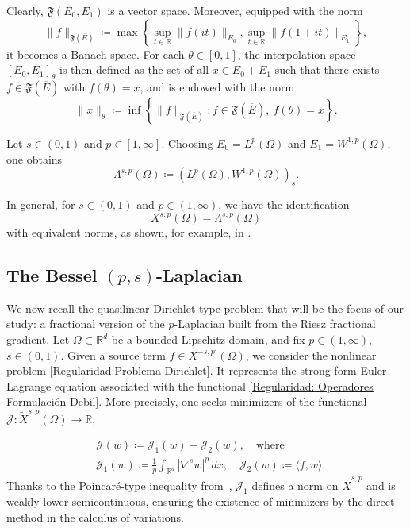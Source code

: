 \documentclass[]{amsart}
\theoremstyle{definition}
\theoremstyle{definition}
\theoremstyle{remark}
\numberwithin{equation}{section}
\begin{document}
Clearly, \( \mathfrak{F}(E_0, E_1) \) is a vector space. Moreover, equipped with the norm
\[
\|f\|_{\mathfrak{F}(\overline{E})} \coloneq \max \left\{ \sup_{t \in \mathbb{R}} \|f(i t)\|_{E_0}, \sup_{t \in \mathbb{R}} \|f(1 + i t)\|_{E_1} \right\},
\]
it becomes a Banach space. For each \( \theta \in [0, 1] \), the interpolation space \( [E_0, E_1]_\theta \) is then defined as the set of all \( x \in E_0 + E_1 \) such that there exists \( f \in \mathfrak{F}(\overline{E}) \) with \( f(\theta) = x \), and is endowed with the norm
\[
\|x\|_\theta \coloneq \inf \left\{ \|f\|_{\mathfrak{F}(\overline{E})} : f \in \mathfrak{F}(\overline{E}), \ f(\theta) = x \right\}.
\]

Let \( s \in (0,1) \) and \( p \in [1, \infty] \). Choosing \( E_0 = L^p(\Omega) \) and \( E_1 = W^{1,p}(\Omega) \), one obtains
\[
\Lambda^{s,p}(\Omega) \coloneq \left(L^{p}(\Omega), W^{1,p}(\Omega)\right)_{s}.
\]

In general, for \( s \in (0,1) \) and \( p \in (1, \infty) \), we have the identification
\[
X^{s,p}(\Omega) = \Lambda^{s,p}(\Omega)
\]
with equivalent norms, as shown, for example, in \cite[Proposition 2.4.3]{campos2021lions}.

\subsection{The Bessel $(p,s)$-Laplacian} \label{sec:(p,s)-Lap}
We now recall the quasilinear Dirichlet-type problem that will be the focus of our study: a fractional version of the $p$-Laplacian built from the Riesz fractional gradient. Let \( \Omega \subset \mathbb{R}^d \) be a bounded Lipschitz domain, and fix \( p \in (1, \infty) \), \( s \in (0,1) \). Given a source term \( f \in X^{-s, p'}(\Omega) \), we consider the nonlinear problem \eqref{Regularidad:Problema Dirichlet}. 
It
represents the strong-form Euler–Lagrange equation associated with the functional \eqref{Regularidad: Operadores Formulación Debil}. More precisely, one seeks minimizers of the functional $\mathcal{J} \colon \widetilde{X}^{s,p}(\Omega) \to \mathbb{R}$,

\begin{equation} \label{eq:functionals} 
\begin{split}
& \mathcal{J}(w) \coloneq \mathcal{J}_1(w) - \mathcal{J}_2(w),
\quad \text{where} \\
& \mathcal{J}_1(w) \coloneq \frac{1}{p} \int_{\mathbb{R}^d} \left|\nabla^s w\right|^p\,dx, 
\quad
\mathcal{J}_2(w) \coloneq \langle f, w \rangle.
\end{split}
\end{equation}
Thanks to the Poincaré-type inequality from~\cite[Theorem 2.9]{bellido2020gammaconvergencepolyconvexfunctionalsinvolving}, \( \mathcal{J}_1 \) defines a norm on $\widetilde{X}^{s,p}$ and is weakly lower semicontinuous, ensuring the existence of minimizers by the direct method in the calculus of variations.
\end{document}
